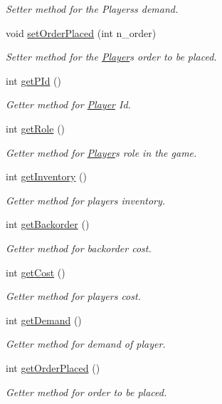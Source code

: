 \begin{DoxyCompactItemize}
\begin{DoxyCompactList}\small\item\em Setter method for the Players\textquotesingle{}s demand. \end{DoxyCompactList}\item 
void \hyperlink{class_player_ab197bac4da8cbf646c6ffa36a16ad0b0}{set\+Order\+Placed} (int n\+\_\+order)
\begin{DoxyCompactList}\small\item\em Setter method for the \hyperlink{class_player}{Player}\textquotesingle{}s order to be placed. \end{DoxyCompactList}\item 
int \hyperlink{class_player_ad815840dfa1c1261900774b5ffd886e3}{get\+P\+Id} ()
\begin{DoxyCompactList}\small\item\em Getter method for \hyperlink{class_player}{Player} Id. \end{DoxyCompactList}\item 
int \hyperlink{class_player_a6baeff2a6218449299cb334c01f1dc28}{get\+Role} ()
\begin{DoxyCompactList}\small\item\em Getter method for \hyperlink{class_player}{Player}\textquotesingle{}s role in the game. \end{DoxyCompactList}\item 
int \hyperlink{class_player_ae21d65a545c20c70ac7a53389b223ce6}{get\+Inventory} ()
\begin{DoxyCompactList}\small\item\em Getter method for player\textquotesingle{}s inventory. \end{DoxyCompactList}\item 
int \hyperlink{class_player_a8080e44c26141d956babb824d2a7ae7c}{get\+Backorder} ()
\begin{DoxyCompactList}\small\item\em Getter method for backorder cost. \end{DoxyCompactList}\item 
int \hyperlink{class_player_a3a1e9666f1da8750452296310ed95e1f}{get\+Cost} ()
\begin{DoxyCompactList}\small\item\em Getter method for player\textquotesingle{}s cost. \end{DoxyCompactList}\item 
int \hyperlink{class_player_a8bfca991628b682ff9cae6d05ee9131c}{get\+Demand} ()
\begin{DoxyCompactList}\small\item\em Getter method for demand of player. \end{DoxyCompactList}\item 
int \hyperlink{class_player_af838b44639ee94d4185917d5d2259ce2}{get\+Order\+Placed} ()
\begin{DoxyCompactList}\small\item\em Getter method for order to be placed. \end{DoxyCompactList}\end{DoxyCompactItemize}

